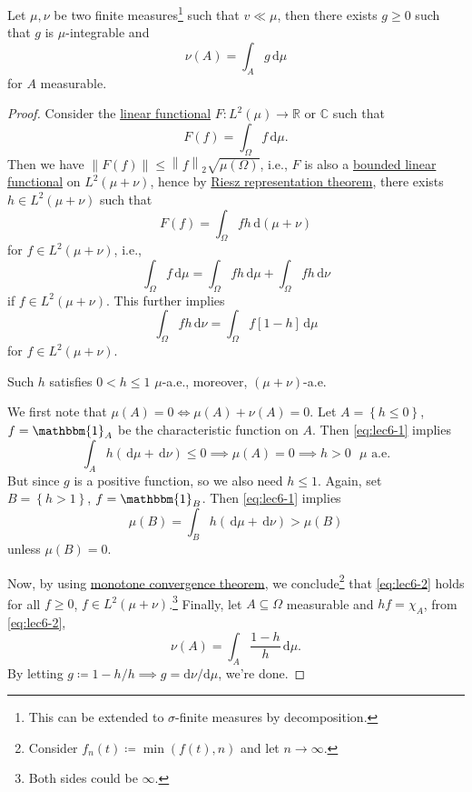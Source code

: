 \begin{theorem}\label{thm:Radon-Nikodym}
	Let \(\mu , \nu \) be two finite measures\footnote{This can be extended to \(\sigma \)-finite measures by decomposition.} such that \(v \ll \mu \), then there exists \(g \geq 0\) such that \(g\) is \(\mu \)-integrable and
	\[
		\nu (A) = \int _A g \,\mathrm{d} \mu
	\]
	for \(A\) measurable.
\end{theorem}
\begin{proof}
	Consider the \hyperref[def:linear-functional]{linear functional} \(F\colon L^2(\mu ) \to \mathbb{R} \) or \(\mathbb{C} \) such that
	\[
		F(f) = \int _{\Omega }f\,\mathrm{d} \mu .
	\]
	Then we have \(\left\lVert F(f)\right\rVert \leq \left\lVert f\right\rVert _2 \sqrt{ \mu (\Omega )}\), i.e., \(F\) is also a \hyperref[def:bounded-linear-functional]{bounded linear functional} on \(L^2(\mu + \nu )\), hence by \hyperref[thm:Riesz-representation]{Riesz representation theorem}, there exists \(h\in L^2(\mu +\nu )\) such that
	\[
		F(f) = \int_\Omega  fh\,\mathrm{d} (\mu +\nu )
	\]
	for \(f\in L^2(\mu + \nu )\), i.e.,
	\begin{equation}\label{eq:lec6-1}
		\int _\Omega f\,\mathrm{d} \mu = \int _\Omega fh\,\mathrm{d} \mu + \int _\Omega fh \,\mathrm{d} \nu
	\end{equation}
	if \(f\in L^2(\mu +\nu )\). This further implies
	\begin{equation}\label{eq:lec6-2}
		\int _\Omega fh\,\mathrm{d} \nu = \int _\Omega f[1 - h] \,\mathrm{d} \mu
	\end{equation}
	for \(f\in L^2(\mu + \nu )\).
	\begin{claim}
		Such \(h\) satisfies \(0 < h \leq 1\) \(\mu\)-a.e., moreover, \((\mu+\nu )\)-a.e.
	\end{claim}
	\begin{explanation}
		We first note that \(\mu (A) = 0 \iff \mu (A) + \nu (A) = 0\). Let \(A = \left\{ h \leq 0 \right\} \), \(f = \mathbbm{1}_{A}\) be the characteristic function on \(A\). Then \autoref{eq:lec6-1} implies
		\[
			\int _A h ( \,\mathrm{d} \mu  + \,\mathrm{d} \nu ) \leq 0 \implies \mu (A) = 0 \implies h > 0 \text{ \(\mu\) a.e.}
		\]
		But since \(g\) is a positive function, so we also need \(h \leq 1\). Again, set \(B = \left\{ h > 1 \right\} \), \(f = \mathbbm{1}_{B}\). Then \autoref{eq:lec6-1} implies
		\[
			\mu (B) = \int _B h \left( \,\mathrm{d} \mu + \,\mathrm{d} \nu  \right) > \mu (B)
		\]
		unless \(\mu (B) = 0\).
	\end{explanation}


	Now, by using \href{https://en.wikipedia.org/wiki/Monotone_convergence_theorem}{monotone convergence theorem}, we conclude\footnote{Consider \(f_n(t) \coloneqq \min (f(t), n)\) and let \(n\to \infty \).} that \autoref{eq:lec6-2} holds for all \(f \geq 0\), \(f\in L^2(\mu + \nu )\).\footnote{Both sides could be \(\infty\).} Finally, let \(A\subseteq \Omega \) measurable and \(hf = \chi _A\), from \autoref{eq:lec6-2},
	\[
		\nu (A) = \int _A \frac{1 - h}{h}\,\mathrm{d} \mu.
	\]
	By letting \(g \coloneqq 1 - h / h \implies g = \mathrm{d}\nu /\mathrm{d}\mu\), we're done.
\end{proof}

